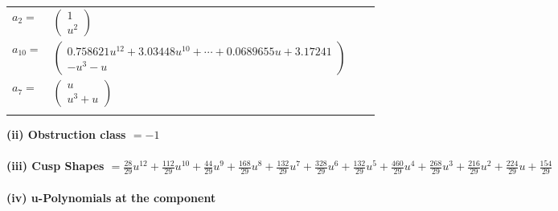 \documentclass[1p]{elsarticle_modified}
\theoremstyle{definition}
\begin{document}
\begin{tabular}{m{7pt} m{180pt} m{7pt} m{180pt} }
\flushright $a_{2}=$&$\begin{pmatrix}1\\u^2\end{pmatrix}$ \\
\flushright $a_{10}=$&$\begin{pmatrix}0.758621 u^{12}+3.03448 u^{10}+\cdots+0.0689655 u+3.17241\\- u^3- u\end{pmatrix}$ \\
\flushright $a_{7}=$&$\begin{pmatrix}u\\u^3+u\end{pmatrix}$\\&\end{tabular}
\flushleft \textbf{(ii) Obstruction class $= -1$}\\~\\
\flushleft \textbf{(iii) Cusp Shapes $= \frac{28}{29} u^{12}+\frac{112}{29} u^{10}+\frac{44}{29} u^9+\frac{168}{29} u^8+\frac{132}{29} u^7+\frac{328}{29} u^6+\frac{132}{29} u^5+\frac{460}{29} u^4+\frac{268}{29} u^3+\frac{216}{29} u^2+\frac{224}{29} u+\frac{154}{29}$}\\~\\
\newpage\renewcommand{\arraystretch}{1}
\flushleft \textbf{(iv) u-Polynomials at the component}\newline \\
\end{document}
